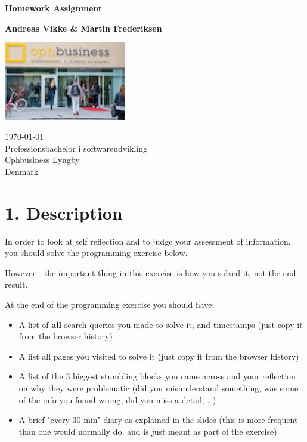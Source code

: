 \documentclass[10pt]{report}
\date{}
\begin{document}
\begin{titlepage}
  \begin{center}
    \vspace*{1cm}

    \Huge
    \textbf{Homework Assignment}
         
    \vspace{1.5cm}

    \LARGE
    \textbf{Andreas Vikke \& Martin Frederiksen}

    \vfill
  
    \includegraphics[width=0.4\textwidth]{7fe3c3f6-Stego}
    
    \vfill
    
    \Large
    \today\\
    Professionsbachelor i softwareudvikling\\
    Cphbusiness Lyngby\\
    Denmark
         
  \end{center}
\end{titlepage}

\chapter*{1. Description}
\pagestyle{fancy}
\noindent In order to look at self reflection and to judge your assessment of information, you should solve the programming exercise below.

\noindent However - the important thing in this exercise is how you solved it, not the end result.

\noindent At the end of the programming exercise you should have:

\begin{itemize}
  \item A list of \textbf{all} search queries you made to solve it, and timestamps (just copy it from the browser history)
  \item A list all pages you visited to solve it (just copy it from the browser history)
  \item A list of the 3 biggest stumbling blocks you came across and your reflection on why they were problematic (did you misunderstand something, was some of the info you found wrong, did you miss a detail, …)
  \item A brief "every 30 min" diary as explained in the slides (this is more frequent than one would normally do, and is just meant as part of the exercise)
\end{itemize}
\end{document}
